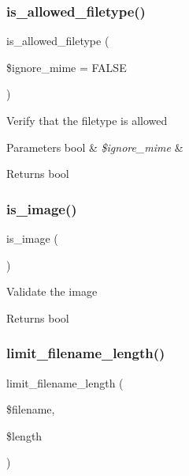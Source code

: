 \subsubsection{\texorpdfstring{is\+\_\+allowed\+\_\+filetype()}{is\_allowed\_filetype()}}
{\footnotesize\ttfamily is\+\_\+allowed\+\_\+filetype (\begin{DoxyParamCaption}\item[{}]{\$ignore\+\_\+mime = {\ttfamily FALSE} }\end{DoxyParamCaption})}

Verify that the filetype is allowed


\begin{DoxyParams}[1]{Parameters}
bool & {\em \$ignore\+\_\+mime} & \\
\hline
\end{DoxyParams}
\begin{DoxyReturn}{Returns}
bool 
\end{DoxyReturn}
\mbox{\label{class_c_i___upload_af6f513bc693e3ba836f23fe9bebc6427}} 
\subsubsection{\texorpdfstring{is\+\_\+image()}{is\_image()}}
{\footnotesize\ttfamily is\+\_\+image (\begin{DoxyParamCaption}{ }\end{DoxyParamCaption})}

Validate the image

\begin{DoxyReturn}{Returns}
bool 
\end{DoxyReturn}
\mbox{\label{class_c_i___upload_ab1f627192a69c4b88a44ad60ba05d0af}} 
\subsubsection{\texorpdfstring{limit\+\_\+filename\+\_\+length()}{limit\_filename\_length()}}
{\footnotesize\ttfamily limit\+\_\+filename\+\_\+length (\begin{DoxyParamCaption}\item[{}]{\$filename,  }\item[{}]{\$length }\end{DoxyParamCaption})}


